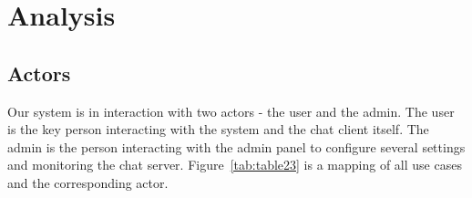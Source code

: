 

\chapter{Analysis}\label{ch:analysis}



\section{Actors}\label{sec:actors}

Our system is in interaction with two actors - the user and the admin.
The user is the key person interacting with the system and the chat client itself.
The admin is the person interacting with the admin panel to configure several settings and monitoring the chat server.
Figure~\ref{tab:table23} is a mapping of all use cases and the corresponding actor.

